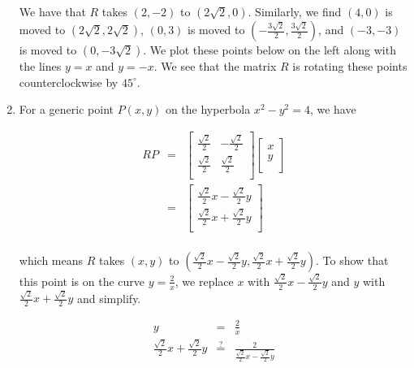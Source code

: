 \documentclass{ximera}
\begin{document}
\begin{example}
\begin{enumerate}
We have that $R$ takes $(2,-2)$ to $(2 \sqrt{2}, 0)$.  Similarly, we find $(4,0)$ is moved to $(2\sqrt{2}, 2\sqrt{2})$, $(0,3)$ is moved to $\left(-\frac{3 \sqrt{2}}{2},  \frac{3 \sqrt{2}}{2} \right)$, and $(-3,-3)$ is moved to $(0,-3\sqrt{2})$.  We plot these points below on the left along with the lines $y=x$ and $y=-x$. We see that the matrix $R$ is rotating these points counterclockwise by $45^{\circ}$.

\item  For a generic point $P(x,y)$ on the hyperbola $x^2-y^2=4$, we have  

\[\begin{array}{rcl}

RP & = &  \left[ \begin{array}{rr} \frac{\sqrt{2}}{2} & -\frac{\sqrt{2}}{2} \\ [3pt] \frac{\sqrt{2}}{2} & \frac{\sqrt{2}}{2} \\ \end{array} \right]\left[ \begin{array}{r} x \\ [3pt] y \\ \end{array} \right] \\ [13pt]

& = & \left[ \begin{array}{r} \frac{\sqrt{2}}{2} x - \frac{\sqrt{2}}{2} y \\ [3pt] \frac{\sqrt{2}}{2} x + \frac{\sqrt{2}}{2} y \\ \end{array} \right] \\

\end{array}\]

which means $R$ takes $(x,y)$ to $\left(\frac{\sqrt{2}}{2} x - \frac{\sqrt{2}}{2} y, \frac{\sqrt{2}}{2} x + \frac{\sqrt{2}}{2} y\right)$.  To show that this point is on the curve $y = \frac{2}{x}$, we replace $x$ with $\frac{\sqrt{2}}{2} x - \frac{\sqrt{2}}{2} y$ and $y$ with $\frac{\sqrt{2}}{2} x + \frac{\sqrt{2}}{2} y$ and simplify.

\[ \begin{array}{rcl}

y & = & \frac{2}{x} \\

\frac{\sqrt{2}}{2} x + \frac{\sqrt{2}}{2} y & \stackrel{?}{=} & \frac{2}{\frac{\sqrt{2}}{2} x - \frac{\sqrt{2}}{2} y} \\[10pt]


\end{array}\]
\end{enumerate}
\end{example}
\end{document}
